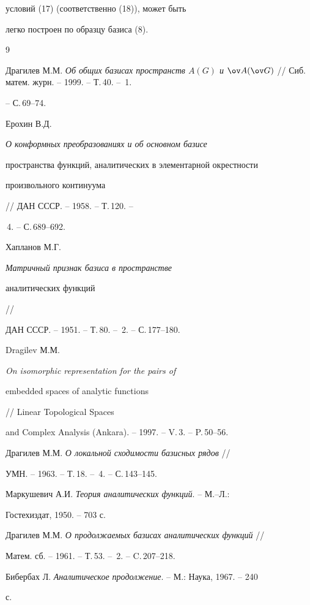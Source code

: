 условий (17) (соответственно (18)), может быть 


легко построен по образцу базиса (8). 


 


\begin{thebibliography}{9} 


 




Драгилев М.М. {\em Об общих базисах пространств $A(G)$ и $\ov A(\ov 


G)$} // Сиб. матем. журн. -- 1999. -- Т.\,40. -- \No\,1.


-- С.\,69--74.




Ерохин В.Д. {\em О конформных преобразованиях и об основном базисе 


пространства функций, аналитических в элементарной окрестности 


произвольного континуума} // ДАН СССР. -- 1958. -- Т.\,120. -- 


\No\,4. -- С.\,689--692. 




Хапланов М.Г. {\em Матричный признак базиса в пространстве 


аналитических функций} // 


ДАН СССР. -- 1951. -- Т.\,80. -- \No\,2. -- С.\,177--180. 




Dragilev М.М. {\em On isomorphic representation for the pairs of 


embedded spaces of analytic functions} // Linear Topological Spaces 


and Complex Analysis (Ankara). -- 1997. -- V.\,3. -- P.\,50--56. 




Драгилев М.М. {\em О локальной сходимости базисных рядов} // 


УМН. -- 1963. -- Т.\,18. -- \No\,4. -- С.\,143--145. 




Маркушевич А.И. {\em Теория аналитических функций}. -- М.--Л.: 


Гостехиздат, 1950. -- 703 с. 




Драгилев М.М. {\em О продолжаемых базисах аналитических функций} // 


Матем. сб. -- 1961. -- Т.\,53. -- \No\,2. -- C.\,207--218. 




Бибербах Л. {\em Аналитическое продолжение}. -- М.: Наука, 1967. -- 240 


с. 


 


\end{thebibliography} 


